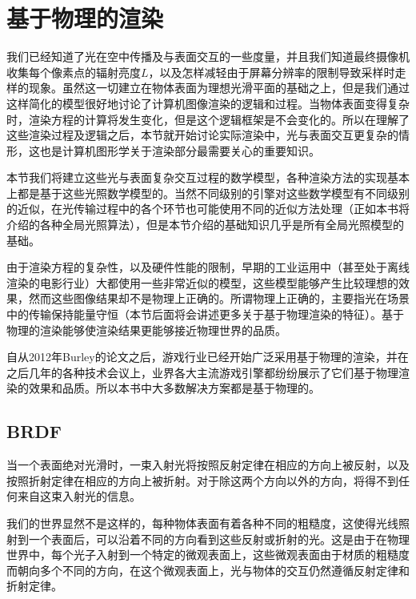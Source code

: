 \section{基于物理的渲染}
我们已经知道了光在空中传播及与表面交互的一些度量，并且我们知道最终摄像机收集每个像素点的辐射亮度$L$，以及怎样减轻由于屏幕分辨率的限制导致采样时走样的现象。虽然这一切建立在物体表面为理想光滑平面的基础之上，但是我们通过这样简化的模型很好地讨论了计算机图像渲染的逻辑和过程。当物体表面变得复杂时，渲染方程的计算将发生变化，但是这个逻辑框架是不会变化的。所以在理解了这些渲染过程及逻辑之后，本节就开始讨论实际渲染中，光与表面交互更复杂的情形，这也是计算机图形学关于渲染部分最需要关心的重要知识。

本节我们将建立这些光与表面复杂交互过程的数学模型，各种渲染方法的实现基本上都是基于这些光照数学模型的。当然不同级别的引擎对这些数学模型有不同级别的近似，在光传输过程中的各个环节也可能使用不同的近似方法处理（正如本书将介绍的各种全局光照算法），但是本节介绍的基础知识几乎是所有全局光照模型的基础。

由于渲染方程的复杂性，以及硬件性能的限制，早期的工业运用中（甚至处于离线渲染的电影行业）大都使用一些非常近似的模型，这些模型能够产生比较理想的效果，然而这些图像结果却不是物理上正确的。所谓物理上正确的，主要指光在场景中的传输保持能量守恒（本节后面将会讲述更多关于基于物理渲染的特征）。基于物理的渲染能够使渲染结果更能够接近物理世界的品质。

自从2012年Burley的论文\cite{a:PhysicallyBasedShadingatDisney}之后，游戏行业已经开始广泛采用基于物理的渲染，并在之后几年的各种技术会议上，业界各大主流游戏引擎都纷纷展示了它们基于物理渲染的效果和品质。所以本书中大多数解决方案都是基于物理的。







\subsection{BRDF}\label{sec:intro-BRDF}
当一个表面绝对光滑时，一束入射光将按照反射定律在相应的方向上被反射，以及按照折射定律在相应的方向上被折射。对于除这两个方向以外的方向，将得不到任何来自这束入射光的信息。

我们的世界显然不是这样的，每种物体表面有着各种不同的粗糙度，这使得光线照射到一个表面后，可以沿着不同的方向看到这些反射或折射的光。这是由于在物理世界中，每个光子入射到一个特定的微观表面上，这些微观表面由于材质的粗糙度而朝向多个不同的方向，在这个微观表面上，光与物体的交互仍然遵循反射定律和折射定律。

